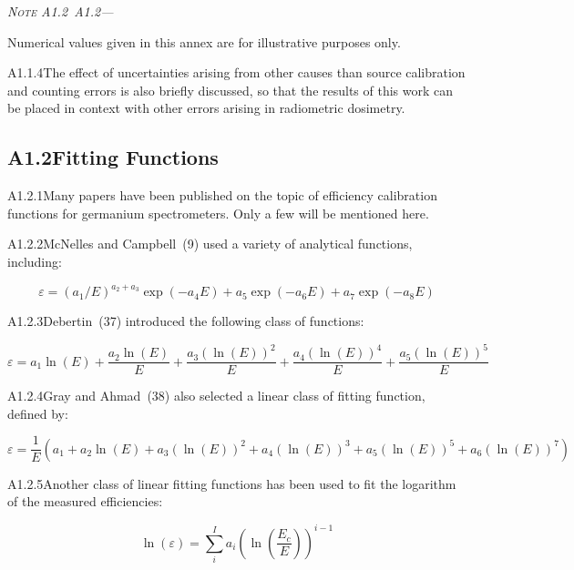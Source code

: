 \documentclass[12pt]{article}
\newenvironment{astmnote}[1][\relax]{%
  \par\smallskip\noindent\textit{N\textsc{ote}%
  \ifx#1\relax\else~#1\fi---}\ignorespaces
}{%
  \par\smallskip
}
\begin{document}
\begin{astmnote}[A1.2]
Numerical values given in this annex are for illustrative purposes only.
\end{astmnote}

A1.1.4\quad The effect of uncertainties arising from other causes than source calibration
and counting errors is also briefly discussed, so that the results of this work can be
placed in context with other errors arising in radiometric dosimetry.

\subsection*{A1.2\quad Fitting Functions}

A1.2.1\quad Many papers have been published on the topic of efficiency calibration
functions for germanium spectrometers. Only a few will be mentioned here.

A1.2.2\quad McNelles and Campbell~(9) used a variety of analytical functions, including:

\begin{equation}
  \varepsilon = (a_1/E)^{a_2+a_3}\exp(-a_4 E)
    + a_5\exp(-a_6 E) + a_7\exp(-a_8 E)
  \tag{A1.1}
  \label{eq:A1.1}
\end{equation}

A1.2.3\quad Debertin~(37) introduced the following class of functions:

\begin{equation}
  \varepsilon = a_1\ln(E) + \frac{a_2\ln(E)}{E}
    + \frac{a_3(\ln(E))^2}{E} + \frac{a_4(\ln(E))^4}{E}
    + \frac{a_5(\ln(E))^5}{E}
  \tag{A1.2}
  \label{eq:A1.2}
\end{equation}

A1.2.4\quad Gray and Ahmad~(38) also selected a linear class of fitting function,
defined by:

\begin{equation}
  \varepsilon = \frac{1}{E}\!\left(a_1 + a_2\ln(E) + a_3(\ln(E))^2
    + a_4(\ln(E))^3 + a_5(\ln(E))^5
    + a_6(\ln(E))^7\right)
  \tag{A1.3}
  \label{eq:A1.3}
\end{equation}

A1.2.5\quad Another class of linear fitting functions has been used to fit the logarithm
of the measured efficiencies:

\begin{equation}
  \ln(\varepsilon) = \sum_{i}^{I} a_i \left(\ln\!\left(\frac{E_c}{E}\right)\right)^{\!i-1}
  \tag{A1.4}
  \label{eq:A1.4}
\end{equation}
\end{document}
